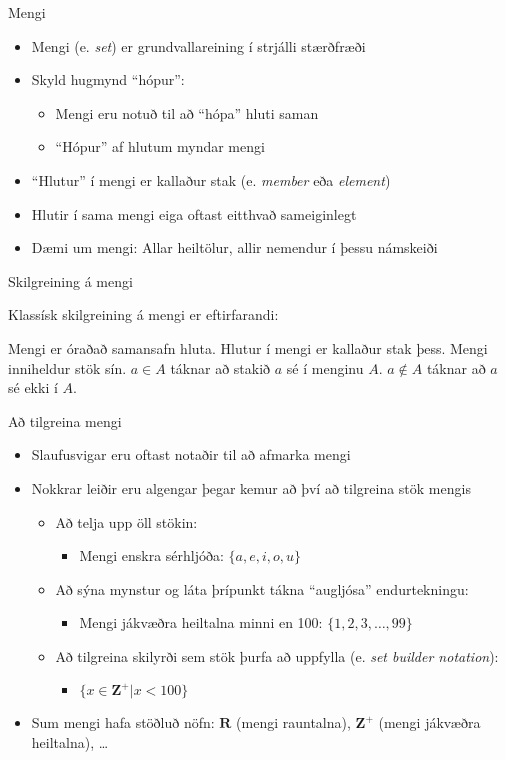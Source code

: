 \documentclass{beamer}
\begin{document}
\begin{frame}{Mengi}
\begin{itemize}
 \item Mengi (e. \emph{set}) er grundvallareining í strjálli stærðfræði
 \item Skyld hugmynd ``hópur'':
 \begin{itemize}
  \item Mengi eru notuð til að ``hópa'' hluti saman
  \item ``Hópur'' af hlutum myndar mengi
 \end{itemize}
 \item ``Hlutur'' í mengi er kallaður stak (e. \emph{member} eða \emph{element})
 \item Hlutir í sama mengi eiga oftast eitthvað sameiginlegt
 \item Dæmi um mengi: Allar heiltölur, allir nemendur í þessu námskeiði
\end{itemize}
\end{frame}

\begin{frame}{Skilgreining á mengi}

Klassísk skilgreining á mengi er eftirfarandi:
\begin{tcolorbox}[title=Mengi]
Mengi er óraðað samansafn hluta. Hlutur í mengi er kallaður stak þess. Mengi inniheldur stök sín. $a \in A$ táknar að stakið $a$ sé í menginu $A$. $a \notin A$ táknar að $a$ sé ekki í $A$.
\end{tcolorbox}

\end{frame}

\begin{frame}{Að tilgreina mengi}
\begin{itemize}
 \item Slaufusvigar eru oftast notaðir til að afmarka mengi
 \item Nokkrar leiðir eru algengar þegar kemur að því að tilgreina stök mengis
 \begin{itemize}
  \item Að telja upp öll stökin: 
  \begin{itemize}
   \item Mengi enskra sérhljóða: $\{a, e, i, o, u\}$
  \end{itemize}
  \item Að sýna mynstur og láta þrípunkt tákna ``augljósa'' endurtekningu:
  \begin{itemize}
   \item Mengi jákvæðra heiltalna minni en 100: $\{1, 2, 3,\ldots, 99\}$
  \end{itemize}
  \item Að tilgreina skilyrði sem stök þurfa að uppfylla (e. \emph{set builder notation}):
  \begin{itemize}
   \item $\{x \in \mathbf{Z^+} | x < 100\}$
  \end{itemize}
 \end{itemize}
 \item Sum mengi hafa stöðluð nöfn: $\mathbf{R}$ (mengi rauntalna), $\mathbf{Z^+}$ (mengi jákvæðra heiltalna), \ldots
\end{itemize}
\end{frame}
\end{document}
